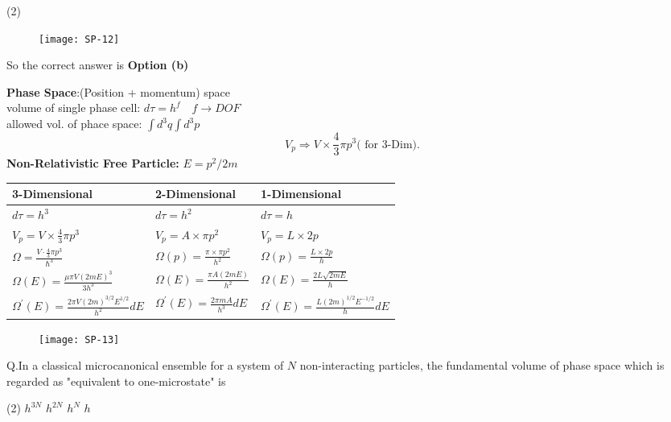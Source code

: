  \begin{tasks}(2)
\end{tasks}
\begin{answer}
	\begin{figure}[H]
		\centering
		\texttt{[image: SP-12]}
	\end{figure}
	So the correct answer is \textbf{Option (b)}
\end{answer}
\textbf{Phase Space}:(Position + momentum) space\\
volume of single phase cell: $d \tau=h^{f} \quad f \rightarrow D O F$\\
allowed vol. of phace space: $\int d^{3} q \int d^{3} p$\\
$$
V_{p} \Rightarrow V \times \frac{4}{3} \pi p^{3}\text{( for 3-Dim).}
$$
\textbf{Non-Relativistic Free Particle: }$E=p^2/2m$\\
\renewcommand*{\arraystretch}{1.8}
 \begin{tabular}{|p{4cm}|p{4cm}|p{4cm}|}
 	\hline
 3-Dimensional&2-Dimensional&1-Dimensional\\\hline
 $d \tau=h^{3}$&$d \tau=h^{2}$&$d \tau=h$\\\hline
 $V_{p}=V \times \frac{4}{3} \pi p^{3}$&$V_{p}=A \times \pi p^{2}$&$V_p=L\times2p$\\\hline
 $\Omega=\frac{V \cdot \frac{4}{3} \pi p^{3}}{\hbar^{3}}$&$\Omega(p)=\frac{\pi \times \pi p^{2}}{h^{2}}$&$\Omega(p)=\frac{L \times 2 p}{h}$\\\hline
 $\Omega(E)=\frac{\mu\pi V(2mE)^3}{3h^3}$&$\Omega(E)=\frac{\pi A(2mE)}{h^2}$&$\Omega(E)=\frac{2L\sqrt{2mE}}{h}$\\\hline
 $\Omega^{\prime}(E)=\frac{2 \pi V(2 m)^{3 / 2} E^{1 / 2}}{h^2}dE$&$\Omega^{\prime}(E)=\frac{2 \pi mA}{h^3}dE$&$\Omega^{\prime}(E)=\frac{L(2m)^{1/2}E^{-1/2}}{h}dE$\\\hline
 \end{tabular}
\begin{figure}[H]
	\texttt{[image: SP-13]}
\end{figure}
Q.In a classical microcanonical ensemble for a system of $N$ non-interacting particles, the fundamental volume of phase space which is regarded as "equivalent to one-microstate" is 
 \begin{tasks}(2)
	\task[\textbf{a.}] $h^{3 N}$
	\task[\textbf{b.}]$h^{2 N}$
	\task[\textbf{c.}]$h^{N}$
	\task[\textbf{d.}]$h$
\end{tasks}
